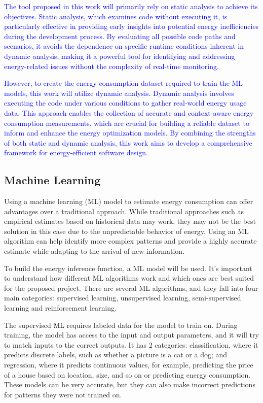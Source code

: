 \documentclass[sigplan]{acmart}
\newcommand{\wnote}[1]{\textcolor{blue}{#1}}
\begin{document}
\wnote{The tool proposed in this work will primarily rely on static analysis to achieve its objectives. Static analysis, which examines code without executing it, is particularly effective in providing early insights into potential energy inefficiencies during the development process. By evaluating all possible code paths and scenarios, it avoids the dependence on specific runtime conditions inherent in dynamic analysis, making it a powerful tool for identifying and addressing energy-related issues without the complexity of real-time monitoring.}

\wnote{However, to create the energy consumption dataset required to train the ML models, this work will utilize dynamic analysis. Dynamic analysis involves executing the code under various conditions to gather real-world energy usage data. This approach enables the collection of accurate and context-aware energy consumption measurements, which are crucial for building a reliable dataset to inform and enhance the energy optimization models. By combining the strengths of both static and dynamic analysis, this work aims to develop a comprehensive framework for energy-efficient software design.}


\subsection{Machine Learning} \label{sec:background_machine_learning}

Using a machine learning (ML) model to estimate energy consumption can offer advantages over a traditional approach. While traditional approaches such as empirical estimates based on historical data may work, they may not be the best solution in this case due to the unpredictable behavior of energy. Using an ML algorithm can help identify more complex patterns and provide a highly accurate estimate while adapting to the arrival of new information.

To build the energy inference function, a ML model will be used. It's important to understand how different ML algorithms work and which ones are best suited for the proposed project. There are several ML algorithms, and they fall into four main categories\cite{sarker2021machine}: supervised learning, unsupervised learning, semi-supervised learning and reinforcement learning.

The supervised ML requires labeled data for the model to train on. During training, the model has access to the input and output parameters, and it will try to match inputs to the correct outputs. It has 2 categories: classification, where it predicts discrete labels, such as whether a picture is a cat or a dog; and regression, where it predicts continuous values, for example, predicting the price of a house based on location, size, and so on or predicting energy consumption. These models can be very accurate, but they can also make incorrect predictions for patterns they were not trained on.
\end{document}
